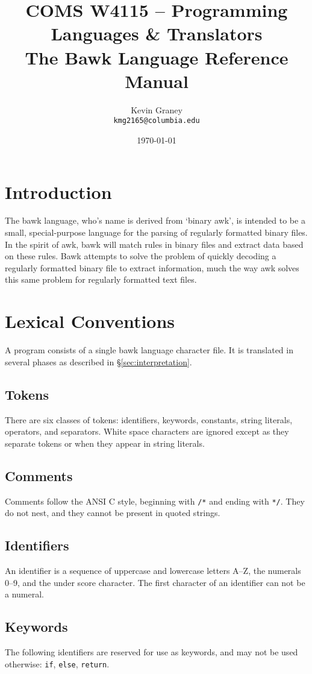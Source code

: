 \documentclass[letterpaper]{article}
\title{
	{\large COMS W4115 -- Programming Languages \& Translators}\\
	The Bawk Language Reference Manual}
\author{Kevin Graney\\
	\texttt{kmg2165@columbia.edu}}
\date{\today}
\begin{document}
\maketitle
\tableofcontents

\section{Introduction}
The bawk language, who's name is derived from `binary awk', is intended to be a small, special-purpose language for the parsing of regularly formatted binary files.  In the spirit of awk, bawk will match rules in binary files and extract data based on these rules.  Bawk attempts to solve the problem of quickly decoding a regularly formatted binary file to extract information, much the way awk solves this same problem for regularly formatted text files.

\section{Lexical Conventions}
A program consists of a single bawk language character file.  It is translated in several phases as described in \S\ref{sec:interpretation}.

\subsection{Tokens}
There are six classes of tokens: identifiers, keywords, constants, string literals, operators, and separators.  White space characters are ignored except as they separate tokens or when they appear in string literals.

\subsection{Comments}
Comments follow the ANSI C style, beginning with \texttt{/*} and ending with \texttt{*/}.  They do not nest, and they cannot be present in quoted strings.

\subsection{Identifiers}
An identifier is a sequence of uppercase and lowercase letters A--Z, the numerals 0--9, and the under score character.  The first character of an identifier can not be a numeral.

\subsection{Keywords}
The following identifiers are reserved for use as keywords, and may not be used otherwise: \texttt{if}, \texttt{else}, \texttt{return}.
\end{document}
